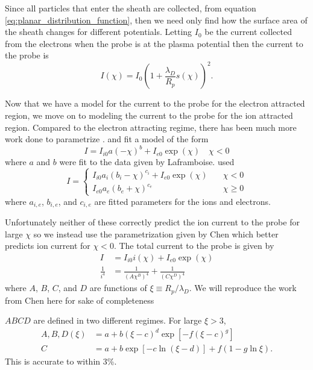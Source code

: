 Since all particles that enter the sheath are collected, from equation \ref{eq:planar_distribution_function}, then we need only find how the surface area of the sheath changes for different potentials. Letting $I_0$ be the current collected from the electrons when the probe is at the plasma potential then the current to the probe is
\begin{equation}
  I(\chi) = I_0 \left(1 + \frac{\lambda_D}{R_p} s(\chi)\right)^2.
  \label{eq:planar_probe_current}
\end{equation}

Now that we have a model for the current to the probe for the electron attracted region, we move on to modeling the current to the probe for the ion attracted region. Compared to the electron attracting regime, there has been much more work done to parametrize \cite{Laframboise_1966}. \cite{Steinbrüchel_1990} and \cite{Karamcheti_Steinbrüchel_1999} fit a model of the form
\begin{equation*}
  I = I_{i0} a (-\chi)^b + I_{e0} \exp(\chi) \quad \chi < 0
\end{equation*}
where $a$ and $b$ were fit to the data given by Laframboise. \cite{Mausbach_1997} used
\begin{equation*}
  I = \begin{cases}
    I_{i0} a_i (b_i - \chi)^{c_i} + I_{e0} \exp(\chi) \quad & \chi < 0 \\
    I_{e0} a_e (b_e + \chi)^{c_e} \quad & \chi \geq 0
  \end{cases}
\end{equation*}
where $a_{i,e}$, $b_{i,e}$, and $c_{i,e}$ are fitted parameters for the ions and electrons. 

Unfortunately neither of these correctly predict the ion current to the probe for large $\chi$ so we instead use the parametrization given by Chen \cite{Chen_2001} which better predicts ion current for $\chi < 0$. The total current to the probe is given by
\begin{align*}
  I &= I_{i0} i(\chi) + I_{e0} \exp(\chi) \\
\frac{1}{i^4} &= \frac{1}{\left(A \chi^B\right)^4} + \frac{1}{\left(C \chi^D\right)^4}
\end{align*}
where $A$, $B$, $C$, and $D$ are functions of $\xi \equiv R_p / \lambda_D$. We will reproduce the work from Chen here for sake of completeness

$ABCD$ are defined in two different regimes. For large $\xi > 3$,
\begin{align*}
  A, B, D(\xi) &= a + b(\xi-c)^d \exp[-f(\xi-c)^g] \\
  C &= a + b \exp[-c \ln(\xi - d)] + f(1-g \ln \xi).
\end{align*}
This is accurate to within 3\%.

